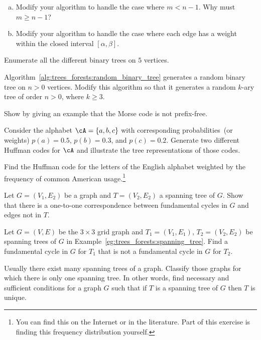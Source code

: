 \begin{problem}
\begin{enumerate}[(a)]
  \item Modify your algorithm to handle the case where $m < n-1$. Why
    must $m \geq n-1$?

  \item Modify your algorithm to handle the case where each edge has a
    weight within the closed interval $[\alpha, \beta]$.
  \end{enumerate}

\item Enumerate all the different binary trees on
  $5$ vertices.

\item Algorithm~\ref{alg:trees_forests:random_binary_tree} generates a
  random binary tree
  on $n > 0$ vertices. Modify this algorithm so that it generates a
  random $k$-ary tree of order $n > 0$, where $k \geq 3$.

\item Show by giving an example that the Morse code
  is not prefix-free.

\item Consider the alphabet $\cA = \{a,b,c\}$ with corresponding
  probabilities~(or weights) $p(a) = 0.5$, $p(b) = 0.3$, and
  $p(c) = 0.2$. Generate two different Huffman
  codes for $\cA$ and illustrate the tree representations of those
  codes.

\item Find the Huffman code for the letters of the
  English alphabet weighted by the frequency
  of common American usage.\footnote{
    You can find this on the Internet or in the literature. Part of
    this exercise is finding this frequency distribution yourself.
  }

\item Let $G = (V_1, E_2)$ be a graph and $T = (V_2, E_2)$ a spanning
  tree of $G$. Show that there is a one-to-one correspondence between
  fundamental cycles in $G$ and edges not in
  $T$.

\item Let $G = (V,E)$ be the $3 \times 3$ grid graph
  and $T_1 = (V_1, E_1)$, $T_2 = (V_2, E_2)$ be spanning trees of $G$
  in Example~\ref{eg:trees_forests:spanning_tree}. Find a fundamental
  cycle in $G$ for $T_1$ that is not a fundamental cycle in $G$ for
  $T_2$.

\item Usually there exist many spanning trees of a graph. Classify
  those graphs for which there is only one spanning tree. In other
  words, find necessary and sufficient conditions for a graph $G$ such
  that if $T$ is a spanning tree of $G$ then $T$ is unique.


\end{problem}
